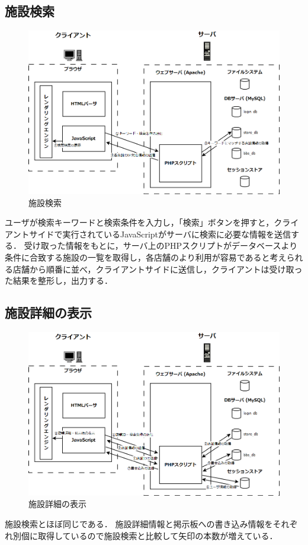 \documentclass[a4paper]{jsarticle}
\begin{document}
\subsection{施設検索}
\begin{figure}[htbp]
  \centering
  \includegraphics[width=0.8\linewidth]{../../image/story/3_search}
  \caption{施設検索}
  \label{fig:search}
\end{figure}
ユーザが検索キーワードと検索条件を入力し，「検索」ボタンを押すと，クライアントサイドで実行されているJavaScriptがサーバに検索に必要な情報を送信する．
受け取った情報をもとに，サーバ上のPHPスクリプトがデータベースより条件に合致する施設の一覧を取得し，各店舗のより利用が容易であると考えられる店舗から順番に並べ，クライアントサイドに送信し，クライアントは受け取った結果を整形し，出力する．

\subsection{施設詳細の表示}
\begin{figure}[htbp]
  \centering
  \includegraphics[width=0.8\linewidth]{../../image/story/4_detail}
  \caption{施設詳細の表示}
  \label{fig:search}
\end{figure}
施設検索とほぼ同じである．
施設詳細情報と掲示板への書き込み情報をそれぞれ別個に取得しているので施設検索と比較して矢印の本数が増えている．
\end{document}
